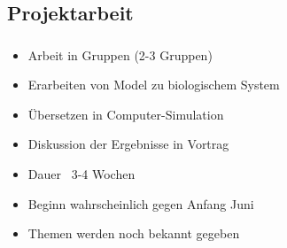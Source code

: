 \subsection{Projektarbeit}
\label{subsec:project}
\begin{frame}
    \frametitle{\insertsubsection}
    \begin{itemize}[<+->]
        \item Arbeit in Gruppen (2-3 Gruppen)
        \item Erarbeiten von Model zu biologischem System
        \item Übersetzen in Computer-Simulation
        \item Diskussion der Ergebnisse in Vortrag
        \item Dauer ~3-4 Wochen
        \item Beginn wahrscheinlich gegen Anfang Juni
        \item Themen werden noch bekannt gegeben
    \end{itemize}
\end{frame}

